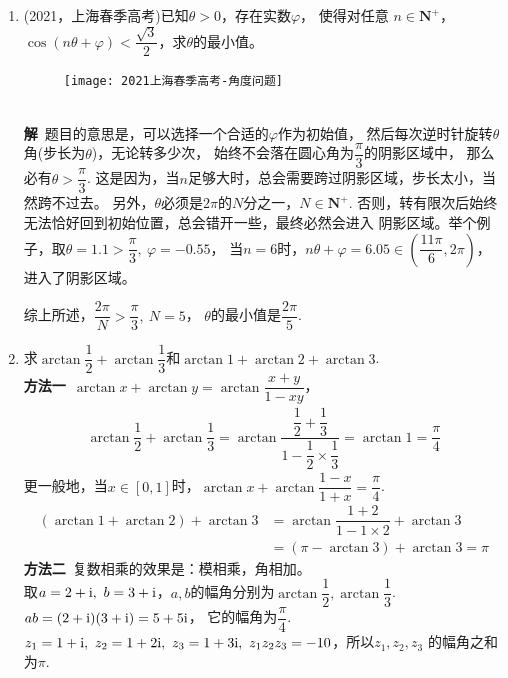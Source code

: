 \begin{enumerate}[label={【\textbf{例\thechapter.\arabic*}】},
 leftmargin=\inteval{\myenumleftmargin}pt,
 itemsep=\inteval{\myenumitempsep}pt,
 itemindent=\inteval{\myenumitemindent}pt]
\item (2021，上海春季高考)已知$ \theta>0 $，存在实数$ \varphi $，
使得对任意 $ n\in \mathbf{N}^{+} $，$ \cos(n\theta+\varphi)
<\dfrac{\sqrt{3}}{2} $，求$ \theta $的最小值。
\begin{figure}[!ht]
    \centering
    \texttt{[image: 2021上海春季高考-角度问题]}
\end{figure} \\
\textbf{解}\ 题目的意思是，可以选择一个合适的$ \varphi $作为初始值，
然后每次逆时针旋转$ \theta $角(步长为$ \theta $)，无论转多少次，
始终不会落在圆心角为$ \dfrac{\pi}{3} $的阴影区域中，
那么必有$ \theta>\dfrac{\pi}{3} $. 
这是因为，当$ n $足够大时，总会需要跨过阴影区域，步长太小，当然跨不过去。
另外，$ \theta $必须是$ 2\pi $的$ N $分之一，$ N\in \textbf{N}^+ $.
否则，转有限次后始终无法恰好回到初始位置，总会错开一些，最终必然会进入
阴影区域。举个例子，取$ \theta=1.1>\dfrac{\pi}{3},\ \varphi=-0.55 $，
当$ n=6 $时，$ n\theta+\varphi=6.05\in\left(\dfrac{11\pi}{6},
2\pi\right) $，进入了阴影区域。

综上所述，$ \dfrac{2\pi}{N}>\dfrac{\pi}{3},\ N=5 $，
$ \theta $的最小值是$ \dfrac{2\pi}{5} $. 

\item 求$ \arctan \dfrac{1}{2}+\arctan \dfrac{1}{3} $和$ \arctan 1+
\arctan 2+\arctan 3 $. \\
\textbf{方法一}\ $ \arctan x+\arctan y=\arctan\dfrac{x+y}{1-xy} $，
\begin{gather*}
    \arctan \dfrac{1}{2}+ \arctan\dfrac{1}{3}=\arctan\dfrac{\dfrac{1}{2}
        +\dfrac{1}{3}}{1-\dfrac{1}{2}\times \dfrac{1}{3}}=\arctan 1=\dfrac{\pi}{4}
\end{gather*}
更一般地，当$ x\in [0,1] $时，$ \arctan x+\arctan \dfrac{1-x}{1+x}=\dfrac{\pi}{4} $. 
\begin{align*}
    (\arctan 1+\arctan 2)+\arctan 3 &=\arctan\dfrac{1+2}{1-1\times 2}
    +\arctan3 \\ &= (\pi-\arctan 3)+\arctan 3=\pi
\end{align*}
\textbf{方法二}\ 复数相乘的效果是：模相乘，角相加。\\
取$ a=2+\i,\ b=3+\i $，$ a,b $的幅角分别为$ \arctan 
\dfrac{1}{2},\arctan \dfrac{1}{3} $. \\ $ ab=(2+\mathrm{i})(3+\mathrm{i})=5+5\mathrm{i} $，
它的幅角为$ \dfrac{\pi}{4} $. \\
$ z_1=1+\i,\ z_2=1+2\i,\ z_3=1+3\i,\ z_1z_2z_3=-10 $，所以$ z_1,z_2,z_3 $
的幅角之和为$ \pi $. 


\end{enumerate}
